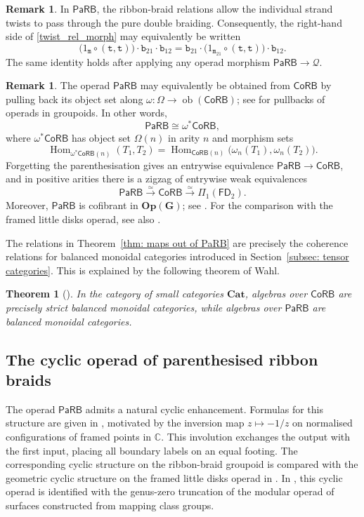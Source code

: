 \documentclass{amsart}
\newcommand{\calQ}{\mathcal{Q}}
\newcommand{\Grpd}{\mathbf{G}}
\newcommand{\CoRB}{\mathsf{CoRB}}
\newcommand{\PaRB}{\mathsf{PaRB}}
\newcommand{\magma}{\mathsf{\Omega}}
\newcommand{\Op}{\mathbf{Op}}
\newcommand{\Hom}{\operatorname{Hom}}
\newcommand{\ob}{\operatorname{ob}}
\newtheorem{thm}[theorem]{Theorem}%
\theoremstyle{definition}
\newtheorem{remark}[theorem]{Remark}%
\numberwithin{equation}{section}
\begin{document}
\begin{remark}
In $\PaRB$, the ribbon-braid relations allow the individual strand
twists to pass through the pure double braiding. Consequently, the
right-hand side of \eqref{twist_rel_morph} may equivalently be written
\[
\bigl(1_{\mathtt m}\circ(\mathtt t,\mathtt t)\bigr)
\cdot\mathtt b_{21}\cdot\mathtt b_{12} = \mathtt b_{21} \cdot \bigl(1_{\mathtt m_{21}}\circ(\mathtt t,\mathtt t)\bigr)
\cdot\mathtt b_{12}.
\]
The same identity holds after applying any operad morphism
$\PaRB\to\calQ$.
\end{remark}

\begin{remark}
The operad $\PaRB$ may equivalently be obtained from $\CoRB$ by
pulling back its object set along
$\omega\colon\magma\to\ob(\CoRB)$; see
\cite[Section~6.1.5]{FresseBook1} for pullbacks of operads in
groupoids. In other words,
\[
\PaRB\cong\omega^*\CoRB,
\]
where $\omega^*\CoRB$ has object set $\magma(n)$ in arity $n$ and
morphism sets
\[
\Hom_{\omega^*\CoRB(n)}(T_1,T_2)
=
\Hom_{\CoRB(n)}\bigl(\omega_n(T_1),\omega_n(T_2)\bigr).
\]
Forgetting the parenthesisation gives an entrywise equivalence
$\PaRB\to\CoRB$, and in positive arities there is a zigzag of
entrywise weak equivalences
\[
\PaRB\xrightarrow{\simeq}\CoRB
\xrightarrow{\simeq}\Pi_1(\mathsf{FD}_2).
\]
Moreover, $\PaRB$ is cofibrant in $\Op(\Grpd)$; see
\cite[Corollary~6.14]{Boavida-Horel-Robertson}. For the comparison
with the framed little disks operad, see also
\cite[Chapter~1]{Wahl_Thesis}.
\end{remark}

The relations in Theorem~\ref{thm: maps out of PaRB} are precisely the
coherence relations for balanced monoidal categories introduced in
Section~\ref{subsec: tensor categories}. This is explained by the
following theorem of Wahl.

\begin{thm}[\textnormal{\cite[Theorem~II.5.11]{Wahl_Thesis}}]
\label{thm: CoRB_and_PaRB_algebras}
In the category of small categories $\mathbf{Cat}$, algebras over $\CoRB$ are precisely strict balanced monoidal categories, while algebras over $\PaRB$ are balanced monoidal categories.
\end{thm}

\subsection{The cyclic operad of parenthesised ribbon braids}
\label{subsec: cyclic PaRB}
The operad $\PaRB$ admits a natural cyclic enhancement. Formulas for
this structure are given in
\cite[Section~3.1]{campos2019configuration}, motivated by the
inversion map $z\mapsto-1/z$ on normalised configurations of framed
points in $\mathbb C$. This involution exchanges the output with the
first input, placing all boundary labels on an equal footing. The
corresponding cyclic structure on the ribbon-braid groupoid is
compared with the geometric cyclic structure on the framed little
disks operad in \cite[Section~5]{cyclic_ribbon}. In
\cite[Proposition~3.15]{BR_modular}, this cyclic operad is identified
with the genus-zero truncation of the modular operad of surfaces
constructed from mapping class groups.
\end{document}
